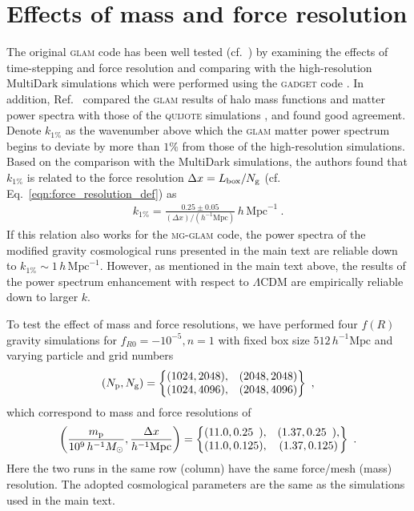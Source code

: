 \section{Effects of mass and force resolution}
\label{appendix:resolution}

The original \textsc{glam} code has been well tested (cf.~\citep{Klypin:2017iwu}) by examining the effects of time-stepping and force resolution and comparing with the high-resolution MultiDark simulations \citep{Klypin:2016MNRAS.457.4340K} which were performed using the \textsc{gadget} code \citep{Springel:2005_Gadget_code_paper}. In addition, Ref.~\citep{Klypin:2020tud} compared the \textsc{glam} results of halo mass functions and matter power spectra with those of the \textsc{quijote} simulations \citep{Villaescusa-Navarro:2020ApJS..250....2V}, and found good agreement. Denote $k_{1\%}$ as the wavenumber above which the \textsc{glam} matter power spectrum begins to deviate by more than $1\%$ from those of the high-resolution simulations. Based on the comparison with the MultiDark simulations, the authors found that $k_{1\%}$ is related to the force resolution $\Delta x = L_{\rm box}/N_{\rm g}$ (cf. Eq.~\eqref{eqn:force_resolution_def}) as 
\begin{align}
    k_{1\%} = \frac{0.25 \pm 0.05}{(\Delta x) / (h^{-1} \mathrm{Mpc})} \, h \, \mathrm{Mpc}^{-1} \ .
\end{align}
If this relation also works for the \textsc{mg-glam} code, the power spectra of the modified gravity cosmological runs presented in the main text are reliable down to $k_{1\%} \sim 1 \, h \, \mathrm{Mpc}^{-1}$. However, as mentioned in the main text above, the results of the power spectrum enhancement with respect to $\Lambda$CDM are empirically reliable down to larger $k$.


To test the effect of mass and force resolutions, we have performed four $f(R)$ gravity simulations for $f_{R0} = -10^{-5}, n = 1$ with fixed box size $512 \, h^{-1}\mathrm{Mpc}$ and varying particle and grid numbers
\begin{align*}
    (N_{\rm p}, N_{\rm g}) = \begin{Bmatrix}
    (1024, 2048),& (2048, 2048) \\ 
    (1024, 4096),& (2048, 4096)
    \end{Bmatrix}\ ,
\end{align*} 
which correspond to mass and force resolutions of 
\begin{align*}
    \qty( \displaystyle \frac{m_{\rm p}}{10^9 \, h^{-1} M_{\odot}}, \frac{\Delta x}{h^{-1} \mathrm{Mpc}} ) = \begin{Bmatrix}
    (11.0, 0.25\phantom{1}), &(1.37, 0.25\phantom{1}), \\
    (11.0, 0.125), &(1.37, 0.125)
    \end{Bmatrix} \ .
\end{align*}
Here the two runs in the same row (column) have the same force/mesh (mass) resolution. The adopted cosmological parameters are the same as the simulations used in the main text.

